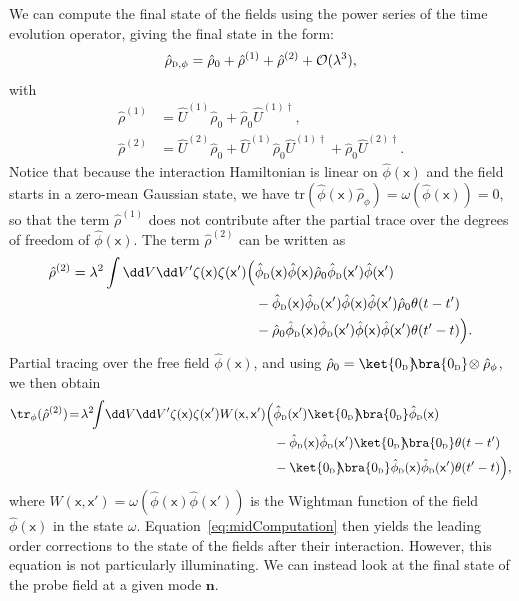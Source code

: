 \documentclass[letterpaper,12pt,titlepage,oneside,final]{book}
\newcommand{\mf}{\mathsf}%
\renewcommand{\r}{\hat{\rho}}
\newcommand{\tc}[1]{\textsc{#1}}
\begin{document}
    We can compute the final state of the fields using the power series of the time evolution operator, giving the final state in the form:
    \begin{equation}\label{eq:rhoDyson}
        \r_{\tc{d},\phi} = \r_0 + \r^{(1)} + \r^{(2)} + \mathcal{O}(\lambda^3),
    \end{equation}
    with
    \begin{align}
        \r^{(1)} &= \hat{U}^{(1)} \r_0 + \r_0 \hat{U}^{(1)\dagger},\\
        \r^{(2)} &= \hat{U}^{(2)} \r_0 + \hat{U}^{(1)} \r_0 \hat{U}^{(1)\dagger} + \r_0 \hat{U}^{(2)\dagger}.
    \end{align}
    Notice that because the interaction Hamiltonian is linear on $\hat{\phi}(\mf x)$ and the field starts in a zero-mean Gaussian state, we have $\text{tr}(\hat{\phi}(\mf x) \hat{\rho}_\phi) = \omega(\hat{\phi}(\mf x)) = 0$, so that the term $\hat{\rho}^{(1)}$ does not contribute after the partial trace over the degrees of freedom of $\hat{\phi}(\mf x)$. The term $\r^{(2)}$ can be written as
    \begin{align}
        \r^{(2)} = \lambda^2 \int \dd V \dd V'\zeta(\mf x) \zeta(\mf x') \Big(&\hat{\phi}_\tc{d}(\mf x) \hat{\phi}(\mf x)\hat{\rho}_0 \hat{\phi}_\tc{d}(\mf x') \hat{\phi}(\mf x')\\
        &-\hat{\phi}_\tc{d}(\mf x)\hat{\phi}_\tc{d}(\mf x')  \hat{\phi}(\mf x)\hat{\phi}(\mf x')\hat{\rho}_0 \theta(t-t') \nonumber\\
        &-\hat{\rho}_0 \hat{\phi}_\tc{d}(\mf x)\hat{\phi}_\tc{d}(\mf x')  \hat{\phi}(\mf x)\hat{\phi}(\mf x')\theta(t'-t) \Big)\nonumber.
    \end{align}
    Partial tracing over the free field $\hat{\phi}(\mf x)$, and using \mbox{$\hat{\rho}_0 = \ket{0_\tc{d}}\!\!\bra{0_\tc{d}}\!\otimes\hat{\rho}_\phi$}, we then obtain
    \begin{align}
        \tr_\phi(\r^{(2)})\! =\!\lambda^2\!\! \int\! \dd V \dd V'\zeta(\mf x) \zeta(\mf x')W(\mf x, \mf x')
        \Big(&\hat{\phi}_\tc{d}(\mf x')\ket{0_\tc{d}}\!\!\bra{0_\tc{d}}\hat{\phi}_\tc{d}(\mf x) \label{eq:midComputation}\\
        &-\hat{\phi}_\tc{d}(\mf x)\hat{\phi}_\tc{d}(\mf x')  \ket{0_\tc{d}}\!\!\bra{0_\tc{d}}\theta(t-t') \nonumber\\
        &-\ket{0_\tc{d}}\!\!\bra{0_\tc{d}}\hat{\phi}_\tc{d}(\mf x)\hat{\phi}_\tc{d}(\mf x')\theta(t'-t) \Big),\nonumber
    \end{align}
    where $W(\mf x, \mf x') = \omega(\hat{\phi}(\mf x) \hat{\phi}(\mf x'))$ is the Wightman function of the field $\hat{\phi}(\mf x)$ in the state $\omega$. Equation~\eqref{eq:midComputation} then yields the leading order corrections to the state of the fields after their interaction. However, this equation is not particularly illuminating.  We can instead look at the final state of the probe field at a given mode $\bm n$. 
    
\end{document}
